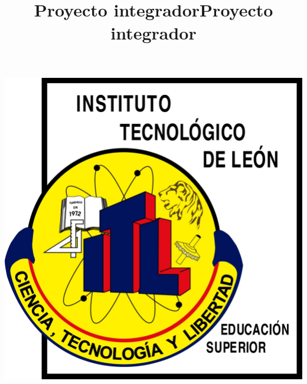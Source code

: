\documentclass[12pt]{article}
\title{Proyecto integrador}
\title{Proyecto integrador}
\begin{document}
						 																											
\newpage

\begin{flushleft}																
	\includegraphics[scale = 0.35]{itl-logo}
\end{flushleft}	
\vspace{-5cm}
\end{document}
